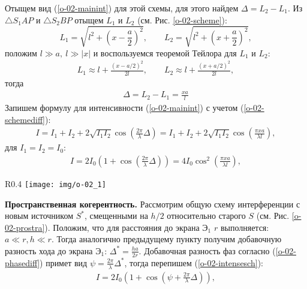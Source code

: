 Отыщем вид (\ref{o-02-mainint}) для этой схемы, для этого найдем $\Delta = L_2 - L_1$. Из
$\triangle S_1AP$ и $\triangle S_2BP$ отыщем $L_1$ и $L_2$ (см. Рис. \ref{o-02-scheme}):
$$
L_1 = \sqrt{l^2 + \left(x-\frac{a}{2}\right)^2}, \qquad
L_2 = \sqrt{l^2 + \left(x+\frac{a}{2}\right)^2},
$$
положим $l \gg a, \ l \gg |x|$ и воспользуемся теоремой Тейлора для $L_1$ и $L_2$:
\begin{gather*}
L_1 \approx l + \frac{\left(x-a/2\right)^2}{2l}, \qquad
L_2 \approx l + \frac{\left(x+a/2\right)^2}{2l},
\end{gather*}
тогда
\begin{gather}
\label{o-02-schemediff}
\displaystyle \Delta = L_2 - L_1 = \frac{xa}{l}
\end{gather}
Запишем формулу для интенсивности (\ref{o-02-mainint}) с учетом (\ref{o-02-schemediff}):
\begin{gather*}
I = I_1 + I_2 + 2\sqrt{I_1 I_2}\cos\left(\frac{2\pi}{\lambda}\Delta\right) =
    I_1 + I_2 + 2\sqrt{I_1 I_2}\cos\left(\frac{\pi x a}{\lambda l}\right),
\end{gather*}
для $I_1 = I_2 = I_0$:
\begin{gather}
\label{o-02-intensesch}
I = 2I_0\left(1 + \cos\left(\frac{2\pi}{\lambda}\Delta\right)\right) =
4I_0\cos^2\left(\frac{\pi xa}{\lambda l}\right),
\end{gather}

\begin{wrapfigure}[6]{R}{0.4\linewidth}
	\texttt{[image: img/o-02\_1]}{}
	\caption{К пространственной когерентности}
	\label{o-02-prostra}
\end{wrapfigure}

\textbf{Пространственная когерентность.}
Рассмотрим общую схему интерференции с новым источником $S^*$, смещенными на $h/2$ относительно старого $S$ (см. Рис. \ref{o-02-prostra}). Положим, что для расстояния до экрана $\text{Э}_1$ $r$ выполняется: $a\ll r, h\ll r$. Тогда аналогично предыдущему пункту получим добавочную разность хода до экрана $\text{Э}_1$: $\Delta^* = \frac{ha}{2r}$. Добавочная разность фаз согласно (\ref{o-02-phasediff}) примет вид $\displaystyle\psi = \frac{2\pi}{\lambda}\Delta^*$, тогда перепишем (\ref{o-02-intensesch}):
\begin{gather}
\label{o-02-intensetwo}
I = 2I_0\left(1+\cos\left(\psi + \frac{2\pi}{\lambda}\Delta\right)\right),
\end{gather}

